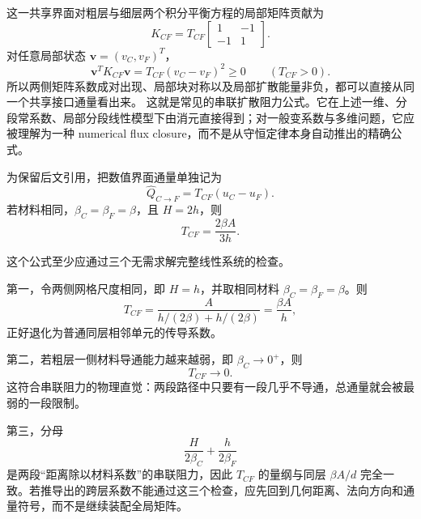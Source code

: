 这一共享界面对粗层与细层两个积分平衡方程的局部矩阵贡献为
\begin{equation}
\boxed{
K_{CF}
=
T_{CF}
\begin{bmatrix}
1&-1\\
-1&1
\end{bmatrix}.
}
\label{eq:amr-interface-two-by-two-block}
\end{equation}
对任意局部状态 $\bm v=(v_C,v_F)^T$，
\begin{equation}
\boxed{
\bm v^TK_{CF}\bm v
=
T_{CF}(v_C-v_F)^2
\ge0
\qquad (T_{CF}>0).
}
\label{eq:amr-interface-energy}
\end{equation}
所以两侧矩阵系数成对出现、局部块对称以及局部扩散能量非负，都可以直接从同一个共享接口通量看出来。
这就是常见的串联扩散阻力公式。它在上述一维、分段常系数、局部分段线性模型下由消元直接得到；对一般变系数与多维问题，它应被理解为一种 numerical flux closure，而不是从守恒定律本身自动推出的精确公式。

为保留后文引用，把数值界面通量单独记为
\begin{equation}
\boxed{
\widehat Q_{C\rightarrow F}
=T_{CF}(u_C-u_F).
}
\label{eq:amr-cf-flux-one-dimensional}
\end{equation}
若材料相同，$\beta_C=\beta_F=\beta$，且 $H=2h$，则
\begin{equation}
T_{CF}=\frac{2\beta A}{3h}.
\label{eq:amr_cf_T_uniform}
\end{equation}

这个公式至少应通过三个无需求解完整线性系统的检查。

第一，令两侧网格尺度相同，即 $H=h$，并取相同材料 $\beta_C=\beta_F=\beta$。则
\begin{equation}
T_{CF}
=
\frac{A}{h/(2\beta)+h/(2\beta)}
=
\frac{\beta A}{h},
\end{equation}
正好退化为普通同层相邻单元的传导系数。

第二，若粗层一侧材料导通能力越来越弱，即 $\beta_C\rightarrow0^{+}$，则
\begin{equation}
T_{CF}\rightarrow0.
\end{equation}
这符合串联阻力的物理直觉：两段路径中只要有一段几乎不导通，总通量就会被最弱的一段限制。

第三，分母
\begin{equation}
\frac{H}{2\beta_C}+\frac{h}{2\beta_F}
\end{equation}
是两段“距离除以材料系数”的串联阻力，因此 $T_{CF}$ 的量纲与同层 $\beta A/d$ 完全一致。若推导出的跨层系数不能通过这三个检查，应先回到几何距离、法向方向和通量符号，而不是继续装配全局矩阵。

